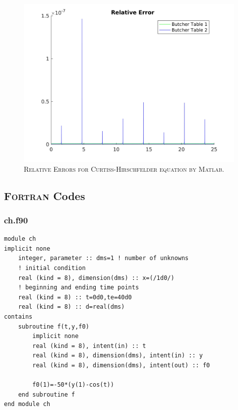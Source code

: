 \documentclass[a4paper,oneside]{book}
\numberwithin{equation}{chapter}
\begin{document}
\begin{figure}[H]
\centering
\includegraphics[scale=0.09]{re}
\caption{\textsc{Relative Errors for Curtiss-Hirschfelder equation by Matlab.}}
\end{figure}
\subsection{\textsc{Fortran} Codes}
\subsubsection{ch.f90}
\begin{lstlisting}
module ch  
implicit none 
	integer, parameter :: dms=1 ! number of unknowns
    ! initial condition
	real (kind = 8), dimension(dms) :: x=(/1d0/) 
    ! beginning and ending time points
	real (kind = 8) :: t=0d0,te=40d0 
	real (kind = 8) :: d=real(dms)
contains      
	subroutine f(t,y,f0)
		implicit none
		real (kind = 8), intent(in) :: t
		real (kind = 8), dimension(dms), intent(in) :: y
		real (kind = 8), dimension(dms), intent(out) :: f0
		
		f0(1)=-50*(y(1)-cos(t))
	end subroutine f
end module ch 
\end{lstlisting}
\end{document}
